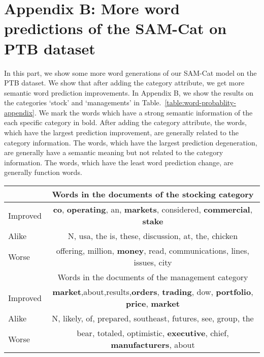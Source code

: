 \documentclass[a4paper]{article}
\begin{document}
\section*{Appendix B: More word predictions of the SAM-Cat on PTB dataset}
In this part, we show some more word generations of our SAM-Cat model on the PTB dataset. We show that after adding the category attribute, we get more semantic word prediction improvements. In Appendix B, we show the results on the categories `stock' and `managements' in Table.~\ref{table:word-probablity-appendix}. We mark the words which have a strong semantic information of the each specific category in bold. After adding the category attribute, the words, which have the largest prediction improvement, are generally related to the category information. The words, which have the largest prediction degeneration, are generally have a semantic meaning but not related to the category information. The words, which have the least word prediction change, are generally function words.
\begin{table*}[ht]
\caption{Word predictions that is improved, alike and worse after adding category attribute in categories `corporate finance', `managers' and `stock market'}
\label{table:word-probablity-appendix}
\begin{center}
\setlength\tabcolsep{3pt}
\begin{tabular}{l|c}
\hline\hline
&Words in the documents of the stocking category\\
\hline
Improved &  \textbf{co}, \textbf{operating}, an, \textbf{markets}, considered, \textbf{commercial}, \textbf{stake}\\
Alike &N, usa, the is, these, discussion, at, the, chicken \\
Worse & offering, million, \textbf{money}, read, communications, lines, issues, city\\
 \hline
 \hline
&Words in the documents of the management category  \\
\hline
Improved &  \textbf{market},about,results,\textbf{orders}, \textbf{trading}, dow, \textbf{portfolio}, \textbf{price}, \textbf{market}\\
Alike &N, likely, of, prepared, southeast, futures, see, group, the\\
Worse & bear, totaled, optimistic, \textbf{executive}, chief, \textbf{manufacturers}, about\\
\hline
\hline
\end{tabular}
\end{center}
\end{table*}
\end{document}
